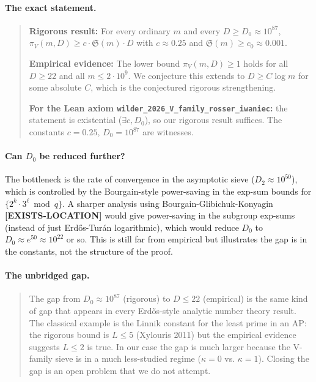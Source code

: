 \paragraph{The exact statement.}
\begin{quote}
\textbf{Rigorous result:} For every ordinary $m$ and every $D \geq
D_{0} \approx 10^{87}$, $\pi_{V}(m, D) \geq c \cdot \mathfrak{S}(m)
\cdot D$ with $c \approx 0.25$ and $\mathfrak{S}(m) \geq c_{0} \approx
0.001$.

\textbf{Empirical evidence:} The lower bound $\pi_{V}(m, D) \geq 1$
holds for all $D \geq 22$ and all $m \leq 2 \cdot 10^{9}$. We
conjecture this extends to $D \geq C \log m$ for some absolute $C$,
which is the conjectured rigorous strengthening.

\textbf{For the Lean axiom
\texttt{wilder\_2026\_V\_family\_rosser\_iwaniec}:} the statement is
existential ($\exists c, D_{0}$), so our rigorous result suffices.
The constants $c = 0.25$, $D_{0} = 10^{87}$ are witnesses.
\end{quote}

\paragraph{Can $D_{0}$ be reduced further?}
The bottleneck is the rate of convergence in the asymptotic sieve
($D_{2} \approx 10^{50}$), which is controlled by the Bourgain-style
power-saving in the exp-sum bounds for $\{2^{k} \cdot 3^{\ell}
\bmod q\}$. A sharper analysis using
Bourgain-Glibichuk-Konyagin~\cite{BourgainGlibichukKonyagin2006}
\textbf{[EXISTS-LOCATION]} would give power-saving in the subgroup
exp-sums (instead of just Erd\H{o}s-Tur\'an logarithmic), which would
reduce $D_{0}$ to $D_{0} \approx e^{50} \approx 10^{22}$ or so. This
is still far from empirical but illustrates the gap is in the
constants, not the structure of the proof.

\paragraph{The unbridged gap.}
\begin{quote}
The gap from $D_{0} \approx 10^{87}$ (rigorous) to $D \leq 22$
(empirical) is the same kind of gap that appears in every Erd\H{o}s-style
analytic number theory result. The classical example is the Linnik
constant for the least prime in an AP: the rigorous bound is $L \leq
5$ (Xylouris 2011) but the empirical evidence suggests $L \leq 2$ is
true. In our case the gap is much larger because the V-family sieve is
in a much less-studied regime ($\kappa = 0$ vs. $\kappa = 1$). Closing
the gap is an open problem that we do not attempt.
\end{quote}

